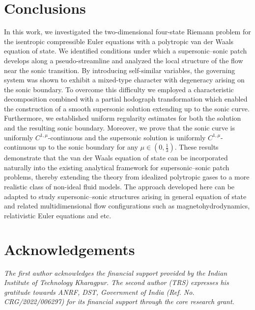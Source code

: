 \documentclass[3p,11pt]{elsarticle}
\numberwithin{equation}{section}
\begin{document}
\section{Conclusions}

In this work, we investigated the two-dimensional four-state Riemann problem for the isentropic compressible Euler equations with a polytropic van der Waals equation of state. We identified conditions under which a supersonic–sonic patch develops along a pseudo-streamline and analyzed the local structure of the flow near the sonic transition. By introducing self-similar variables, the governing system was shown to exhibit a mixed-type character with degeneracy arising on the sonic boundary. To overcome this difficulty we employed a characteristic decomposition combined with a partial hodograph transformation which enabled the construction of a smooth supersonic solution extending up to the sonic curve. Furthermore, we established uniform regularity estimates for both the solution and the resulting sonic boundary. 
Moreover, we prove that the sonic curve is uniformly $C^{1,\mu}$-continuous and the supersonic solution is uniformly $C^{1,\mu}$-continuous up to the sonic boundary for any $\mu\in(0,\frac{1}{3})$. These results demonstrate that the van der Waals equation of state can be incorporated naturally into the existing analytical framework for supersonic–sonic patch problems, thereby extending the theory from idealized polytropic gases to a more realistic class of non-ideal fluid models. The approach developed here can be adapted to study supersonic–sonic structures arising in general equation of state and related multidimensional flow configurations such as magnetohydrodynamics, relativistic Euler equations and etc.

\section*{Acknowledgements}
\textit{The first author acknowledges the financial support provided by the Indian Institute of Technology Kharagpur. The second author (TRS) expresses his gratitude towards ANRF, DST, Government of India (Ref. No. CRG/2022/006297) for its financial support through the core research grant.} 
\end{document}
